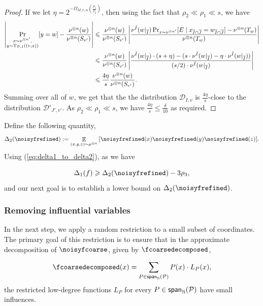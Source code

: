 \documentclass[11pt]{article}
\newcommand\card[1]{\left| {#1} \right|}
\newcommand\Expect[2]{{\mathop{\mathbb{E}}_{#1}\left[ {#2} \right]}}
\newcommand\spn{{\sf span}_{\mathbb{N}}}
\renewcommand\geq{\geqslant}
\renewcommand\leq{\leqslant}
\newcommand{\V}[1]{{#1}}
\begin{document}
\begin{proof}
If we let $\eta = 2^{-\Omega_{M,r,\alpha}\left(\frac{\rho_1}{\rho_2}\right)}$, then using the fact that $\rho_2\ll \rho_1\ll s$, we have
\begin{align*}
    \card{\Pr_{\substack{x\sim \nu^{\otimes n'},\\ y\sim {\rm T}_{\mathcal{P},I} ((v, x))}}[y=w]  - \frac{\nu^{\otimes n}(w)}{\nu^{\otimes n}(S_{v'})}} &\leq \frac{\nu^{\otimes n}(w)}{\nu^{\otimes n}(S_{v'})}\card{ \frac{\nu^{\bar{I}}(w|_{\overline{I}})\Pr_{x\sim \nu^{\otimes n'}}[ E \mid x_{\overline{I}\cap \overline{J}} = w_{\overline{I}\cap \overline{J}}] - \nu^{\otimes n}(T_w)}{\nu^{\otimes n}(T_w)}}\\
    & \leq \frac{\nu^{\otimes n}(w)}{\nu^{\otimes n}(S_{v'})}\card{ \frac{\nu^{\bar{I}}(w|_{\overline{I}})\cdot (s+\eta) - (s\cdot \nu^{\bar{I}}(w|_{\overline{I}})-\eta\cdot \nu^{\bar{I}}(w|_{\overline{I}}))}{(s/2)\cdot \nu^{\bar{I}}(w|_{\overline{I}})}}\\
    &\leq \frac{4\eta}{s} \frac{\nu^{\otimes n}(w)}{\nu^{\otimes n}(S_{v'})}.
\end{align*}
Summing over all of $w$, we get that the the distribution $\mathcal{D}_{I,v}$ is $\frac{4\eta}{s}$-close to the distribution $\mathcal{D}'_{J', v'}$. As $\rho_2\ll \rho_1\ll s$, we have $\frac{4\eta}{s}\leq \frac{\delta}{10}$ as required.
\end{proof} 


Define the following quantity, 
$$\Delta_2(\noisyfrefined) :=\Expect{(\V x, \V y, \V z)\sim \mu^{\otimes n}}{\noisyfrefined(\V x) \noisyfrefined(\V y) \noisyfrefined(\V z)}.$$
 Using (\ref{eq:delta1_to_delta2}), as we have

\begin{equation}\label{eq:Delta_1_to_2}
    \Delta_1(f)\geq \Delta_2(\noisyfrefined) -3\rho_3,
\end{equation}
and our next goal is to establish a lower bound on  $\Delta_2(\noisyfrefined)$.


\subsubsection{Removing influential variables}
\label{sec:remove_inf}



In the next step, we apply a random restriction to a small subset of coordinates. The primary goal of this restriction is to ensure that in the approximate decomposition of $\noisyfcoarse$, given by $\fcoarsedecomposed$,

  \[
	\fcoarsedecomposed(\V x) = \sum\limits_{P\in\spn(\mathcal{P})} P(\V x) \cdot L_P(\V x),
	\]
the restricted low-degree functions $L_P$ for every $P\in \spn(\mathcal{P})$ have small influences.
\end{document}
